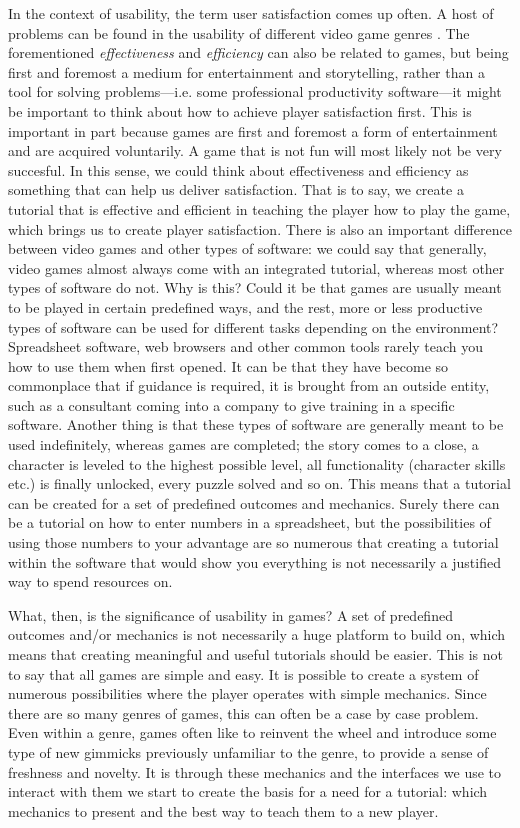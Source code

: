 In the context of usability, the term user satisfaction comes up often. A host of problems can be found in the usability of different video game genres \cite{Pinelle2008b}. The forementioned \textit{effectiveness} and \textit{efficiency} can also be related to games, but being first and foremost a medium for entertainment and storytelling, rather than a tool for solving problems---i.e. some professional productivity software---it might be important to think about how to achieve player satisfaction first. This is important in part because games are first and foremost a form of entertainment and are acquired voluntarily. A game that is not fun will most likely not be very succesful. \cite{Federoff2002} In this sense, we could think about effectiveness and efficiency as something that can help us deliver satisfaction. That is to say, we create a tutorial that is effective and efficient in teaching the player how to play the game, which brings us to create player satisfaction. There is also an important difference between video games and other types of software: we could say that generally, video games almost always come with an integrated tutorial, whereas most other types of software do not. Why is this? Could it be that games are usually meant to be played in certain predefined ways, and the rest, more or less productive types of software can be used for different tasks depending on the environment? Spreadsheet software, web browsers and other common tools rarely teach you how to use them when first opened. It can be that they have become so commonplace that if guidance is required, it is brought from an outside entity, such as a consultant coming into a company to give training in a specific software. Another thing is that these types of software are generally meant to be used indefinitely, whereas games are completed; the story comes to a close, a character is leveled to the highest possible level, all functionality (character skills etc.) is finally unlocked, every puzzle solved and so on. This means that a tutorial can be created for a set of predefined outcomes and mechanics. Surely there can be a tutorial on how to enter numbers in a spreadsheet, but the possibilities of using those numbers to your advantage are so numerous that creating a tutorial within the software that would show you everything is not necessarily a justified way to spend resources on.

What, then, is the significance of usability in games? A set of predefined outcomes and/or mechanics is not necessarily a huge platform to build on, which means that creating meaningful and useful tutorials should be easier. This is not to say that all games are simple and easy. It is possible to create a system of numerous possibilities where the player operates with simple mechanics. Since there are so many genres of games, this can often be a case by case problem. Even within a genre, games often like to reinvent the wheel and introduce some type of new gimmicks previously unfamiliar to the genre, to provide a sense of freshness and novelty. It is through these mechanics and the interfaces we use to interact with them we start to create the basis for a need for a tutorial: which mechanics to present and the best way to teach them to a new player.

